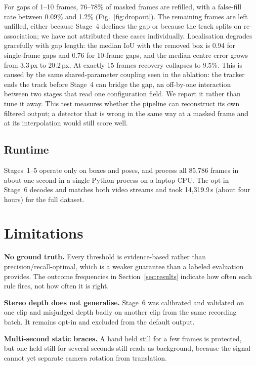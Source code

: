 \documentclass[journal]{IEEEtran}
\begin{document}
For gaps of 1--10 frames, 76--78\% of masked frames are refilled, with a false-fill rate between 0.09\% and 1.2\% (Fig.~\ref{fig:dropout}). The remaining frames are left unfilled, either because Stage~4 declines the gap or because the track splits on re-association; we have not attributed these cases individually. Localisation degrades gracefully with gap length: the median IoU with the removed box is 0.94 for single-frame gaps and 0.76 for 10-frame gaps, and the median centre error grows from 3.3\,px to 20.2\,px. At exactly 15 frames recovery collapses to 9.5\%. This is caused by the same shared-parameter coupling seen in the ablation: the tracker ends the track before Stage~4 can bridge the gap, an off-by-one interaction between two stages that read one configuration field. We report it rather than tune it away. This test measures whether the pipeline can reconstruct its own filtered output; a detector that is wrong in the same way at a masked frame and at its interpolation would still score well.

\subsection{Runtime}
Stages~1--5 operate only on boxes and poses, and process all 85,786 frames in about one second in a single Python process on a laptop CPU. The opt-in Stage~6 decodes and matches both video streams and took 14,319.9\,s (about four hours) for the full dataset.

\section{Limitations}
\label{sec:limitations}

\textbf{No ground truth.} Every threshold is evidence-based rather than precision/recall-optimal, which is a weaker guarantee than a labeled evaluation provides. The outcome frequencies in Section~\ref{sec:results} indicate how often each rule fires, not how often it is right.

\textbf{Stereo depth does not generalise.} Stage~6 was calibrated and validated on one clip and misjudged depth badly on another clip from the same recording batch. It remains opt-in and excluded from the default output.

\textbf{Multi-second static braces.} A hand held still for a few frames is protected, but one held still for several seconds still reads as background, because the signal cannot yet separate camera rotation from translation.
\end{document}
